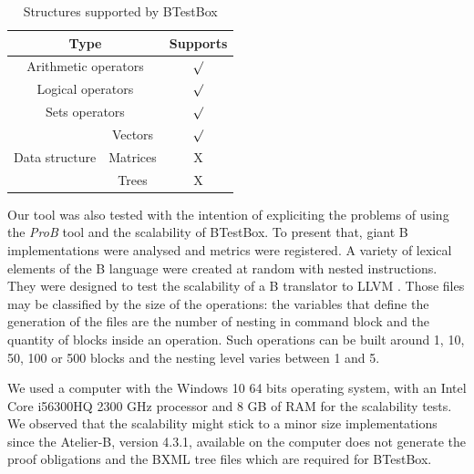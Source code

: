 \documentclass[runningheads]{llncs}
\begin{document}
\begin{table}[h]
\centering
\caption{Structures supported by BTestBox}
\label{tab:tabelaSuportados}
\begin{tabular}{|c|c|c|}
\hline
\multicolumn{2}{|c|}{Type}                     & Supports \\ \hline
\multicolumn{2}{|c|}{Arithmetic operators}   & $\surd$   \\ \hline
\multicolumn{2}{|c|}{Logical operators}       & $\surd$   \\ \hline
\multicolumn{2}{|c|}{Sets operators}  & $\surd$   \\ \hline
\multirow{3}{*}{Data structure} & Vectors  & $\surd$   \\ \cline{2-3} 
                                    & Matrices & X       \\ \cline{2-3} 
                                    & Trees  & X       \\ \hline
\end{tabular}
\end{table}

Our tool was also tested with the intention of expliciting the problems of using the \textit{ProB} tool and the scalability of BTestBox. To present that, giant B implementations were analysed and metrics were registered. A variety of lexical elements of the B language were created at random with nested instructions. They were designed to test the scalability of a B translator to LLVM \cite{deharbebtestbox}. Those files may be classified by the size of the operations: the variables that define the generation of the files are the number of nesting in command block and the quantity of blocks inside an operation. Such operations can be built around 1, 10, 50, 100 or 500 blocks and the nesting level varies between 1 and 5.

We used a computer with the Windows 10 64 bits operating system, with an Intel Core i56300HQ 2300 GHz processor and 8 GB of RAM for the scalability tests. We observed that the scalability might stick to a minor size implementations since the Atelier-B, version 4.3.1, available on the computer does not generate the proof obligations and the BXML tree files which are required for BTestBox.
\end{document}
